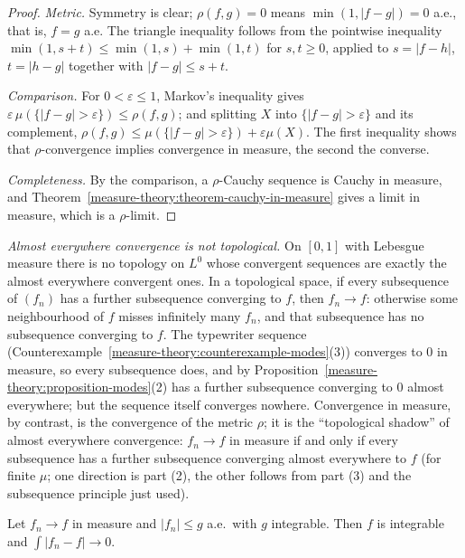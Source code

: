 \begin{proof}
\emph{Metric.} Symmetry is clear; $\rho(f, g) = 0$ means $\min(1, |f - g|) = 0$ a.e., that is, $f = g$ a.e. The triangle inequality follows from the pointwise inequality
$\min(1, s + t) \leq \min(1, s) + \min(1, t)$ for $s, t \geq 0$, applied to $s = |f - h|$, $t = |h - g|$ together with $|f - g| \leq s + t$.

\emph{Comparison.} For $0 < \varepsilon \leq 1$, Markov's inequality gives $\varepsilon\,\mu(\{|f - g| > \varepsilon\}) \leq \rho(f, g)$; and splitting $X$ into $\{|f - g| > \varepsilon\}$ and its
complement, $\rho(f, g) \leq \mu(\{|f - g| > \varepsilon\}) + \varepsilon\mu(X)$. The first inequality shows that $\rho$-convergence implies convergence in measure, the second the converse.

\emph{Completeness.} By the comparison, a $\rho$-Cauchy sequence is Cauchy in measure, and Theorem~\ref{measure-theory:theorem-cauchy-in-measure} gives a limit in measure, which is a $\rho$-limit.
\end{proof}

\begin{remark}\label{measure-theory:remark-ae-not-topological}
\emph{Almost everywhere convergence is not topological.} On $[0, 1]$ with Lebesgue measure there is no topology on $L^0$ whose convergent sequences are exactly the almost everywhere convergent
ones. In a topological space, if every subsequence of $(f_n)$ has a further subsequence converging to $f$, then $f_n \to f$: otherwise some neighbourhood of $f$ misses infinitely many $f_n$,
and that subsequence has no subsequence converging to $f$. The typewriter sequence (Counterexample~\ref{measure-theory:counterexample-modes}(3)) converges to $0$ in measure, so every subsequence
does, and by Proposition~\ref{measure-theory:proposition-modes}(2) has a further subsequence converging to $0$ almost everywhere; but the sequence itself converges nowhere. Convergence in measure, by
contrast, is the convergence of the metric $\rho$; it is the ``topological shadow'' of almost everywhere convergence: $f_n \to f$ in measure if and only if every subsequence has a further subsequence
converging almost everywhere to $f$ (for finite $\mu$; one direction is part (2), the other follows from part (3) and the subsequence principle just used).
\end{remark}

\begin{proposition}\label{measure-theory:proposition-dominated-in-measure}
Let $f_n \to f$ in measure and $|f_n| \leq g$ a.e.\ with $g$ integrable. Then $f$ is integrable and $\int|f_n - f| \to 0$.
\end{proposition}

